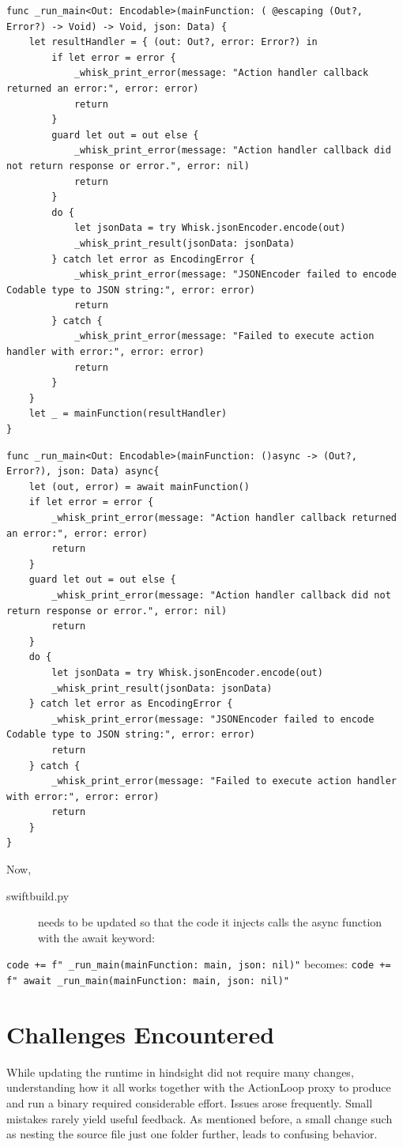 \begin{verbatim}
func _run_main<Out: Encodable>(mainFunction: ( @escaping (Out?, Error?) -> Void) -> Void, json: Data) {
	let resultHandler = { (out: Out?, error: Error?) in
		if let error = error {
			_whisk_print_error(message: "Action handler callback returned an error:", error: error)
			return
		}
		guard let out = out else {
			_whisk_print_error(message: "Action handler callback did not return response or error.", error: nil)
			return
		}
		do {
			let jsonData = try Whisk.jsonEncoder.encode(out)
			_whisk_print_result(jsonData: jsonData)
		} catch let error as EncodingError {
			_whisk_print_error(message: "JSONEncoder failed to encode Codable type to JSON string:", error: error)
			return
		} catch {
			_whisk_print_error(message: "Failed to execute action handler with error:", error: error)
			return
		}
	}
	let _ = mainFunction(resultHandler)
}
\end{verbatim}
\begin{verbatim}
func _run_main<Out: Encodable>(mainFunction: ()async -> (Out?, Error?), json: Data) async{
	let (out, error) = await mainFunction()
	if let error = error {
		_whisk_print_error(message: "Action handler callback returned an error:", error: error)
		return
	}
	guard let out = out else {
		_whisk_print_error(message: "Action handler callback did not return response or error.", error: nil)
		return
	}
	do {
		let jsonData = try Whisk.jsonEncoder.encode(out)
		_whisk_print_result(jsonData: jsonData)
	} catch let error as EncodingError {
		_whisk_print_error(message: "JSONEncoder failed to encode Codable type to JSON string:", error: error)
		return
	} catch {
		_whisk_print_error(message: "Failed to execute action handler with error:", error: error)
		return
	}
}
\end{verbatim}
Now, \begin{description}
	\item [swiftbuild.py] needs to be updated so that the code it injects calls the async function with the await keyword:
\end{description}
\texttt{code += f" _run_main(mainFunction: {main}, json: nil)\n"}
becomes:
\texttt{code += f" await _run_main(mainFunction: {main}, json: nil)\n"}
\section{Challenges Encountered}
\label{sec:Challenges}
While updating the runtime in hindsight did not require many changes, understanding how it all works together with the ActionLoop proxy to produce and run a binary required considerable effort. Issues arose frequently. Small mistakes rarely yield useful feedback. As mentioned before, a small change such as nesting the source file just one folder further, leads to confusing behavior.

